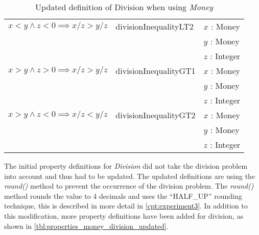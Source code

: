 \begin{table}[!ht]
\begin{tabular}{lll}
\rowcolor[HTML]{EFEFEF} $x < y \land z < 0 \implies x / z > y / z$              & divisionInequalityLT2  & $x$ : Money              \\
\rowcolor[HTML]{EFEFEF}                                                         &                        & $y$ : Money              \\
\rowcolor[HTML]{EFEFEF}                                                         &                        & $z$ : Integer            \\
												$x > y \land z > 0 \implies x / z > y / z$              & divisionInequalityGT1  & $x$ : Money              \\
                                                                                &                        & $y$ : Money              \\
                                                                                &                        & $z$ : Integer            \\
\rowcolor[HTML]{EFEFEF} $x > y \land z < 0 \implies x / z < y / z$              & divisionInequalityGT2  & $x$ : Money              \\
\rowcolor[HTML]{EFEFEF}                                                         &                        & $y$ : Money              \\
\rowcolor[HTML]{EFEFEF}                                                         &                        & $z$ : Integer            \\ \hline
\end{tabular}
\caption{Updated definition of Division when using \textit{Money}}
\label{tbl:properties_money_division_updated}
\end{table}
\FloatBarrier\noindent
The initial property definitions for \textit{Division} did not take the division
problem into account and thus had to be updated. The updated definitions are
using the \textit{round()} method to prevent the occurrence of the division
problem. The \textit{round()} method rounds the value to 4 decimals and uses the
``HALF\_UP'' rounding technique, this is described in more detail in \autoref{cpt:experiment3}.
In addition to this modification, more property
definitions have been added for division, as shown in
\autoref{tbl:properties_money_division_updated}.

